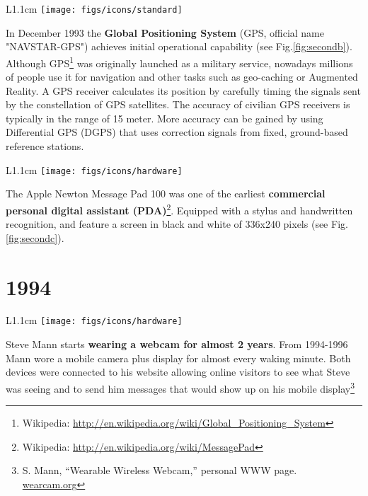 \documentclass[12pt,a4paper]{article}
\begin{document}
\vspace{0.1in}

\begin{wrapfigure}{L}{1.1cm}
	\vspace{-10pt}	
	\texttt{[image: figs/icons/standard]}
	\vspace{-10pt}		
\end{wrapfigure}
\noindent In December 1993 the \textbf{Global Positioning System} (GPS, official name "NAVSTAR-GPS") achieves initial operational capability (see Fig.\ref{fig:secondb}). Although GPS\footnote{Wikipedia: \url{http://en.wikipedia.org/wiki/Global_Positioning_System}} was originally launched as a military service, nowadays millions of people use it for navigation and other tasks such as geo-caching or Augmented Reality. A GPS receiver calculates its position by carefully timing the signals sent by the constellation of GPS satellites. The accuracy of civilian GPS receivers is typically in the range of 15 meter. More accuracy can be gained by using Differential GPS (DGPS) that uses correction signals from fixed, ground-based reference stations.

\vspace{0.1in}

\begin{wrapfigure}{L}{1.1cm}
	\vspace{-17pt}	
	\texttt{[image: figs/icons/hardware]}
	\vspace{-15pt}		
\end{wrapfigure}
\noindent The Apple Newton Message Pad 100 was one of the earliest \textbf{commercial personal digital assistant (PDA)}\footnote{Wikipedia: \url{http://en.wikipedia.org/wiki/MessagePad}}. Equipped with a stylus and handwritten recognition, and feature a screen in black and white of 336x240 pixels (see Fig. \ref{fig:secondc}).

\vspace{-5pt}
\section*{1994}
\begin{wrapfigure}{L}{1.1cm}
	\vspace{-17pt}	
	\texttt{[image: figs/icons/hardware]}
	\vspace{-15pt}		
\end{wrapfigure}
Steve Mann starts \textbf{wearing a webcam for almost 2 years}. From 1994-1996 Mann wore a mobile camera plus display for almost every waking minute. Both devices were connected to his website allowing online visitors to see what Steve was seeing and to send him messages that would show up on his mobile display\footnote{S. Mann, “Wearable Wireless Webcam,” personal WWW page. \url{wearcam.org}}
\end{document}
